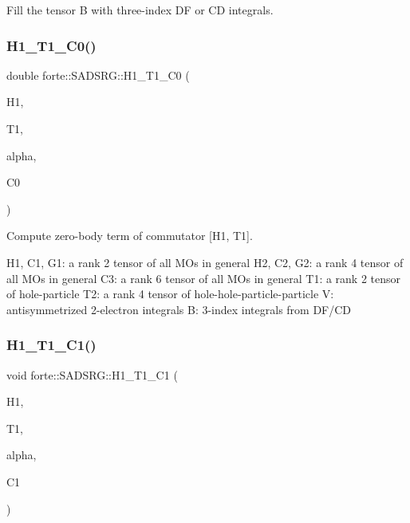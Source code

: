 Fill the tensor B with three-\/index DF or CD integrals. 

\mbox{\label{classforte_1_1_s_a_d_s_r_g_a06df78fa6b6091aa0c628c7b75b651f5}} 
\subsubsection{\texorpdfstring{H1\+\_\+\+T1\+\_\+\+C0()}{H1\_T1\_C0()}}
{\footnotesize\ttfamily double forte\+::\+S\+A\+D\+S\+R\+G\+::\+H1\+\_\+\+T1\+\_\+\+C0 (\begin{DoxyParamCaption}\item[{Blocked\+Tensor \&}]{H1,  }\item[{Blocked\+Tensor \&}]{T1,  }\item[{const double \&}]{alpha,  }\item[{double \&}]{C0 }\end{DoxyParamCaption})\hspace{0.3cm}{\ttfamily [protected]}}



Compute zero-\/body term of commutator \mbox{[}H1, T1\mbox{]}. 

H1, C1, G1\+: a rank 2 tensor of all M\+Os in general H2, C2, G2\+: a rank 4 tensor of all M\+Os in general C3\+: a rank 6 tensor of all M\+Os in general T1\+: a rank 2 tensor of hole-\/particle T2\+: a rank 4 tensor of hole-\/hole-\/particle-\/particle V\+: antisymmetrized 2-\/electron integrals B\+: 3-\/index integrals from D\+F/\+CD \mbox{\label{classforte_1_1_s_a_d_s_r_g_a39bdf433ea05253e35f6b2329e135e81}} 
\subsubsection{\texorpdfstring{H1\+\_\+\+T1\+\_\+\+C1()}{H1\_T1\_C1()}}
{\footnotesize\ttfamily void forte\+::\+S\+A\+D\+S\+R\+G\+::\+H1\+\_\+\+T1\+\_\+\+C1 (\begin{DoxyParamCaption}\item[{Blocked\+Tensor \&}]{H1,  }\item[{Blocked\+Tensor \&}]{T1,  }\item[{const double \&}]{alpha,  }\item[{Blocked\+Tensor \&}]{C1 }\end{DoxyParamCaption})\hspace{0.3cm}{\ttfamily [protected]}}



